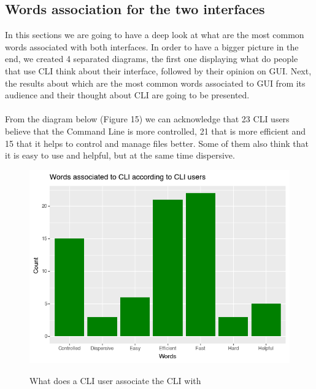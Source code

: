 \documentclass[]{report}
\begin{document}
		
	
	\subsection{Words association for the two interfaces}
	
	In this sections we are going to have a deep look at what are the most common words associated with both interfaces. In order to have a bigger picture in the end, we created 4 separated diagrams, the first one displaying what do people that use CLI think about their interface, followed by their opinion on GUI. Next, the results about which are the most common words associated to GUI from its audience and their thought about CLI are going to be presented.\\\\

	From the diagram below (Figure 15) we can acknowledge that 23 CLI users believe that the Command Line is more controlled, 21 that is more efficient and 15 that it helps to control and manage files better. Some of them also think that it is easy to use and helpful, but at the same time dispersive.
	\begin{figure}[H]
		\centering
		\includegraphics[width=0.75\linewidth]{WordsCLIFromCLI}\\
		\caption{What does a CLI user associate the CLI with}
		\label{fig: 15}
	\end{figure}
	
\end{document}
